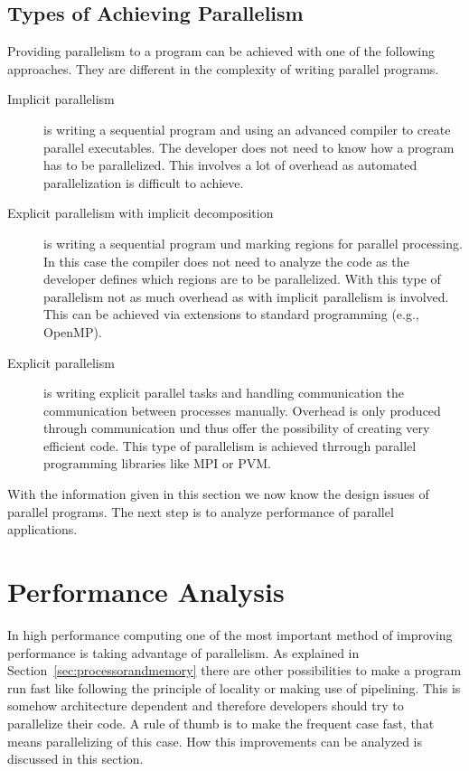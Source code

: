\subsection{Types  of Achieving Parallelism}

Providing parallelism to a program can be achieved with one of the
following approaches. They are different in the complexity of writing
parallel programs.

\begin{description}
\item[Implicit parallelism] is writing a sequential program and using
  an advanced compiler to create parallel executables. The developer
  does not need to know how a program has to be parallelized. This
  involves a lot of overhead as automated parallelization is difficult
  to achieve.
\item[Explicit parallelism with implicit decomposition] is writing a
  sequential program und marking regions for parallel processing. In
  this case the compiler does not need to analyze the code as the
  developer defines which regions are to be parallelized. With this
  type of parallelism not as much overhead as with implicit
  parallelism is involved. This can be achieved via extensions to
  standard programming (e.g., OpenMP). 
\item[Explicit parallelism] is writing explicit parallel tasks and
  handling communication the communication between processes
  manually. Overhead is only produced through communication und thus
  offer the possibility of creating very efficient code. This type of
  parallelism is achieved thrrough parallel programming libraries like
  MPI or PVM.
\end{description}


With the information given in this section we now know the design
issues of parallel programs. The next step is to analyze performance
of parallel applications.

\section{Performance Analysis}
\label{sec:perf_analysis}

In high performance computing one of the most important method of
improving performance is taking advantage of parallelism. As explained
in Section~\ref{sec:processorandmemory} there are other possibilities
to make a program run fast like following the principle of locality
or making use of pipelining. This is somehow architecture
dependent and therefore developers should try to parallelize their
code. A rule of thumb is to make the frequent case fast, that means
parallelizing of this case. How this improvements can be analyzed is
discussed in this section.

